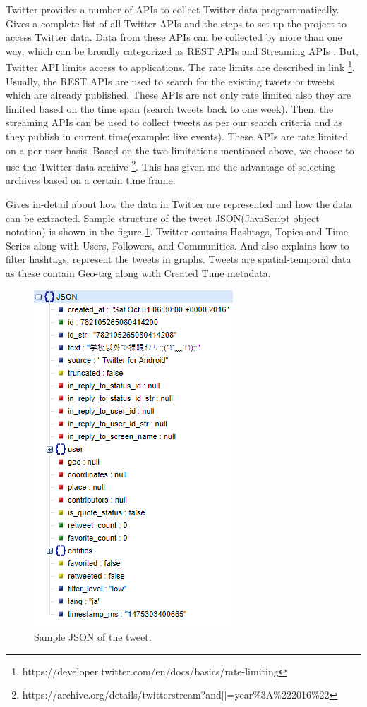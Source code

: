 Twitter provides a number of APIs to collect Twitter data programmatically. \cite{TwitterDevDocs} Gives a complete list of all Twitter APIs and the steps to set up the project to access Twitter data. Data from these APIs can be collected by more than one way, which can be broadly categorized as REST APIs and Streaming APIs . But, Twitter API limits access to applications. The rate limits are described in link  \footnote{https://developer.twitter.com/en/docs/basics/rate-limiting}. Usually, the REST APIs are used to search for the existing tweets or tweets which are already published. These APIs are not only rate limited also they are limited based on the time span (search tweets back to one week). Then, the streaming APIs can be used to collect tweets as per our search criteria and as they publish in current time(example: live events). These APIs are rate limited on a per-user basis. Based on the two limitations mentioned above, we choose to use the Twitter data archive \footnote{https://archive.org/details/twitterstream?and[]=year\%3A\%222016\%22}. This has given me the advantage of selecting archives based on a certain time frame.



\cite{Marco} Gives in-detail about how the data in Twitter are represented
and how the data can be extracted. Sample structure of the tweet JSON(JavaScript object notation) is shown in the figure \ref{fig:Tweet_json}. Twitter contains Hashtags, Topics and Time Series along with
Users, Followers, and Communities. And  \cite{Marco} also explains how to filter hashtags, represent the
tweets in graphs. Tweets are spatial-temporal data as these contain Geo-tag along with Created
Time metadata.

\begin{figure}
	\centering
	\includegraphics[width=0.5\linewidth]{thesis_template/images/tweet_json.png}
	\caption{Sample JSON of the tweet.}
	\label{fig:Tweet_json}
	
\end{figure}



